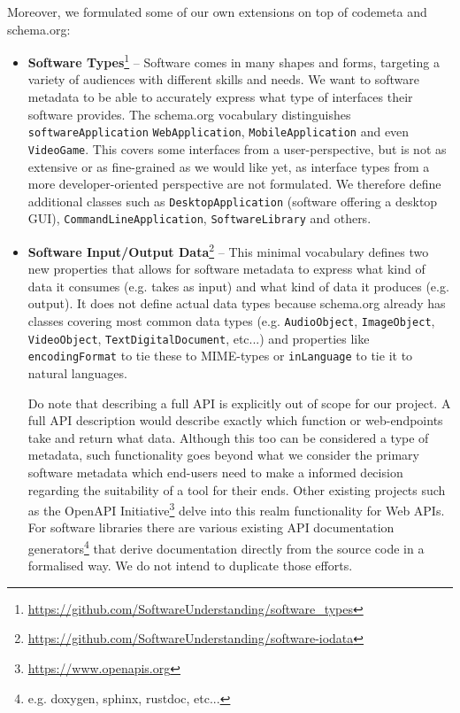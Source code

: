 \documentclass[a4paper,11pt]{article}
\begin{document}
Moreover, we formulated some of our own extensions on top of codemeta and
schema.org:

\begin{itemize}
\item \textbf{Software Types}\footnote{\url{https://github.com/SoftwareUnderstanding/software_types}}
-- Software comes in many shapes and forms, targeting a variety of
audiences with different skills and needs. We want
to software metadata to be able to accurately express what type of
interfaces their software provides. The schema.org vocabulary
distinguishes \texttt{softwareApplication} \texttt{WebApplication},
\texttt{MobileApplication} and even \texttt{VideoGame}. This covers
some interfaces from a user-perspective, but is not as extensive or as
fine-grained as we would like yet, as interface types from a more
developer-oriented perspective are not formulated. We therefore define
additional classes such as \texttt{DesktopApplication} (software
offering a desktop GUI), \texttt{CommandLineApplication},
\texttt{SoftwareLibrary} and others.
\item \textbf{Software Input/Output Data}\footnote{\url{https://github.com/SoftwareUnderstanding/software-iodata}}
-- This minimal vocabulary defines two new properties that allows for software metadata to
express what kind of data it consumes (e.g. takes as input) and what
kind of data it produces (e.g. output). It does not define actual data types because schema.org already has 
classes covering most common data types (e.g. \texttt{AudioObject}, \texttt{ImageObject}, \texttt{VideoObject}, \texttt{TextDigitalDocument}, etc...) and properties
like \texttt{encodingFormat} to tie these to MIME-types or \texttt{inLanguage} to tie it to natural languages.

Do note that describing a full API is explicitly out of scope for our project.
A full API description would describe exactly which function or
web-endpoints take and return what data. Although this too can be
considered a type of metadata, such functionality goes beyond what we consider
the primary software metadata which end-users need to make a informed
decision regarding the suitability of a tool for their ends. Other
existing projects such as the OpenAPI
Initiative\footnote{\url{https://www.openapis.org}} delve into this realm 
functionality for Web APIs. For software libraries there are 
various existing API documentation generators\footnote{e.g. doxygen, sphinx,
rustdoc, etc...} that derive documentation directly from the source
code in a formalised way. We do not intend to duplicate those efforts.
\end{itemize}
\end{document}
